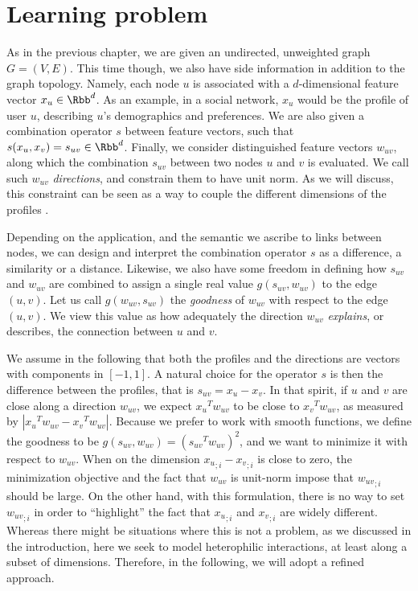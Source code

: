\section{Learning problem}
\label{sec:edge_problem}

As in the previous chapter, we are given an undirected, unweighted graph $G=(V,E)$. This
time though, we also have side information in addition to the graph topology. Namely, each node $u$
is associated with a $d$-dimensional feature vector $x_u \in \Rbb^d$. As an example, in a social
network, $x_u$ would be the profile of user $u$, describing $u$'s demographics and preferences. We
are also given a combination operator $s$ between feature vectors, such that $s(x_u, x_v) = s_{uv}
\in \Rbb^d$. Finally, we consider distinguished feature vectors $w_{uv}$,
along which the combination $s_{uv}$ between two nodes $u$ and $v$ is evaluated. We call such
$w_{uv}$ \emph{directions}, and constrain them to have unit norm. As we will discuss, this
constraint can be seen as a way to couple the different dimensions of the profiles%
.

Depending on the application, and the semantic we ascribe to links between nodes, we can design and
interpret the combination operator $s$ as a difference, a similarity or a distance. Likewise, we
also have some freedom in defining how $s_{uv}$ and $w_{uv}$ are combined to assign a single real
value $g(s_{uv}, w_{uv})$ to the edge $(u,v)$. Let us call $g(w_{uv}, s_{uv})$ the \emph{goodness}
of $w_{uv}$ with respect to the edge $(u,v)$. We view this value as how adequately the direction
$w_{uv}$ \emph{explains}, or describes, the connection between $u$ and $v$.

\medskip

We assume in the following that both the profiles and the directions are vectors with components in
$[-1, 1]$. A natural choice for the operator $s$ is then the difference between the profiles, that is
$s_{uv} = x_u - x_v$. In that spirit, if $u$ and $v$ are close along a direction $w_{uv}$, we expect
${x_u}^T w_{uv}$ to be close to ${x_v}^T w_{uv}$, as measured by $|{x_u}^T w_{uv} - {x_v}^T
w_{uv}|$. Because we prefer to work with smooth functions, we define the goodness to be $g(s_{uv},
w_{uv}) = \left({s_{uv}}^T w_{uv} \right)^2$, and we want to minimize it with respect to $w_{uv}$.
When on the \ith{} dimension ${x_u}_{;i} - {x_v}_{;i}$ is close to zero, the minimization objective
and the fact that $w_{uv}$ is
unit-norm impose that ${w_{uv}}_{;i}$ should be large. On the other hand, with this formulation,
there is no way to set ${w_{uv}}_{;i}$ in order to \enquote{highlight} the fact that
${x_u}_{;i}$ and ${x_v}_{;i}$ are widely different.
Whereas there might be situations where this is not a problem, as we discussed in the introduction,
here we seek to model heterophilic interactions, at least along a subset of dimensions. Therefore, in
the following, we will adopt a refined approach.

